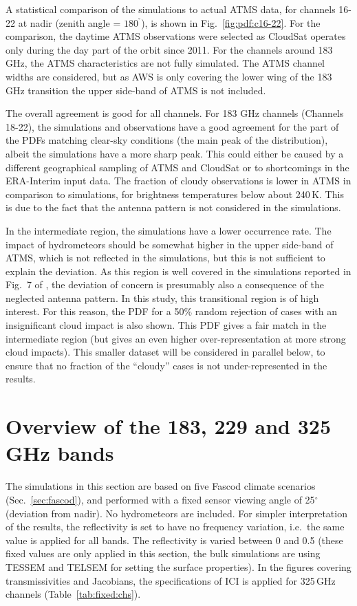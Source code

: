 \documentclass[12pt]{article}
\newcommand{\degree}{\ensuremath{\mathrm{^\circ}}}
\begin{document}
A statistical comparison of the simulations to actual ATMS data, for channels
16-22 at nadir (zenith angle = $180^{\degree}$), is shown in
Fig.~\ref{fig:pdf:c16-22}. For the comparison, the daytime ATMS observations
were selected as CloudSat operates only during the day part of the orbit since
2011. For the channels around 183\,GHz, the ATMS characteristics are not fully
simulated. The ATMS channel widths are considered, but as AWS is only covering
the lower wing of the 183\,GHz transition the upper side-band of ATMS is not
included.

The overall agreement is good for all channels. For 183 GHz channels (Channels
18-22), the simulations and observations have a good agreement for the part of
the PDFs matching clear-sky conditions (the main peak of the distribution),
albeit the simulations have a more sharp peak. This could either be caused by a
different geographical sampling of ATMS and CloudSat or to shortcomings in the
ERA-Interim input data. The fraction of cloudy observations is lower in ATMS in
comparison to simulations, for brightness temperatures below about 240\,K. This
is due to the fact that the antenna pattern is not considered in the
simulations.

In the intermediate region, the simulations have a lower occurrence rate. The
impact of hydrometeors should be somewhat higher in the upper side-band of ATMS,
which is not reflected in the simulations, but this is not sufficient to
explain the deviation. As this region is well covered in the simulations
reported in Fig.~7 of \citet{eriksson:towar:20}, the deviation of concern is
presumably also a consequence of the neglected antenna pattern. In this study,
this transitional region is of high interest. For this reason, the PDF for a
50\% random rejection of cases with an insignificant cloud impact is also
shown. This PDF gives a fair match in the intermediate region (but gives an
even higher over-representation at more strong cloud impacts). This smaller
dataset will be considered in parallel below, to ensure that no fraction of the
``cloudy'' cases is not under-represented in the results.




\section{Overview of the 183, 229 and 325\,GHz bands}
\label{sec:overview}
% 
The simulations in this section are based on five Fascod climate scenarios
(Sec.~\ref{sec:fascod}), and performed with a fixed sensor viewing angle of
25$^\circ$ (deviation from nadir). No hydrometeors are included. For simpler
interpretation of the results, the reflectivity is set to have no frequency
variation, i.e.\ the same value is applied for all bands. The reflectivity is
varied between 0 and 0.5 (these fixed values are only applied in this section,
the bulk simulations are using TESSEM and TELSEM for setting the surface
properties). In the figures covering transmissivities and Jacobians, the
specifications of ICI is applied for 325\,GHz channels
(Table~\ref{tab:fixed:chs}).
\end{document}
